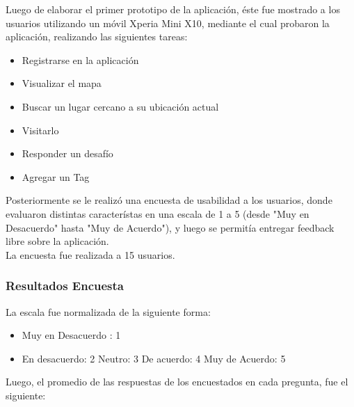 \documentclass[10pt,letterpaper]{article}
\begin{document}
Luego de elaborar el primer prototipo de la aplicación, éste fue mostrado a los usuarios utilizando un móvil Xperia Mini X10, mediante el cual probaron la aplicación, realizando las siguientes tareas:\\

\begin{itemize}
 \item Registrarse en la aplicación
 \item Visualizar el mapa
 \item Buscar un lugar cercano a su ubicación actual
 \item Visitarlo
 \item Responder un desafío
 \item Agregar un Tag
\end{itemize}


Posteriormente se le realizó una encuesta de usabilidad a los usuarios, donde evaluaron distintas característas en una escala de 1 a 5 (desde "Muy en Desacuerdo" hasta "Muy de Acuerdo"), y luego se permitía entregar feedback libre sobre la aplicación.\\

La encuesta fue realizada a 15 usuarios.\\

\subsubsection{Resultados Encuesta}

La escala fue normalizada de la siguiente forma:

\begin{itemize}
\item Muy en Desacuerdo : 1
\item En desacuerdo: 2
Neutro: 3
De acuerdo: 4
Muy de Acuerdo: 5\end{itemize}

Luego, el promedio de las respuestas de los encuestados en cada pregunta, fue el siguiente:\\
\end{document}
